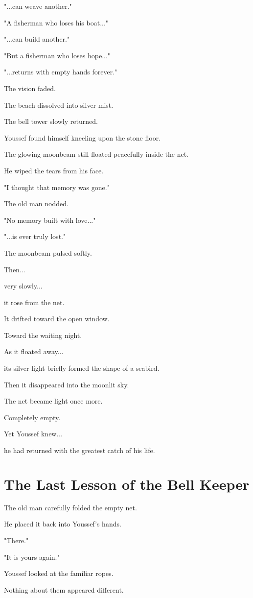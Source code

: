 \documentclass[12pt,openany]{book}
\begin{document}
"...can weave another."

"A fisherman who loses his boat..."

"...can build another."

"But a fisherman who loses hope..."

"...returns with empty hands forever."

The vision faded.

The beach dissolved into silver mist.

The bell tower slowly returned.

Youssef found himself kneeling upon the stone floor.

The glowing moonbeam still floated peacefully inside the net.

He wiped the tears from his face.

"I thought that memory was gone."

The old man nodded.

"No memory built with love..."

"...is ever truly lost."

The moonbeam pulsed softly.

Then...

very slowly...

it rose from the net.

It drifted toward the open window.

Toward the waiting night.

As it floated away...

its silver light briefly formed the shape of a seabird.

Then it disappeared into the moonlit sky.

The net became light once more.

Completely empty.

Yet Youssef knew...

he had returned with the greatest catch of his life.
\section*{The Last Lesson of the Bell Keeper}

The old man carefully folded the empty net.

He placed it back into Youssef's hands.

"There."

"It is yours again."

Youssef looked at the familiar ropes.

Nothing about them appeared different.
\end{document}
